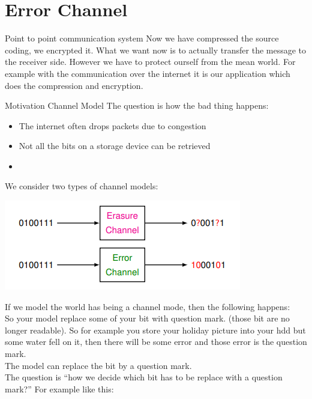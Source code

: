 
\chapter{Error Channel}

\begin{parag}{Point to point communication system}
    Now we have compressed the source coding, we encrypted it. What we want now is to actually transfer the message to the receiver side. However we have to protect ourself from the mean world. For example with the communication over the internet it is our application which does the compression and encryption.
\end{parag}


\begin{parag}{Motivation Channel Model}
    The question is how the bad thing happens:
    \begin{itemize}
        \item The internet often drops packets due to congestion
        \item Not all the bits on a storage device can be retrieved
        \item {}
    \end{itemize}
    We consider two types of channel models:
    \begin{center}
        \includegraphics[scale=1]{12025-04-29.png}
    \end{center}
    If we model the world has being a  channel mode, then the following happens:\\
    So your model replace some of your bit with question mark. (those bit are no longer readable). So for example you store your holiday picture into your hdd but some water fell on it, then there will be some error and those error is the question mark.\\
    The model can  replace the bit by a question mark.\\
The question is ``how we decide which bit has to be replace with a question mark?'' For example like this:\\

\end{parag}
